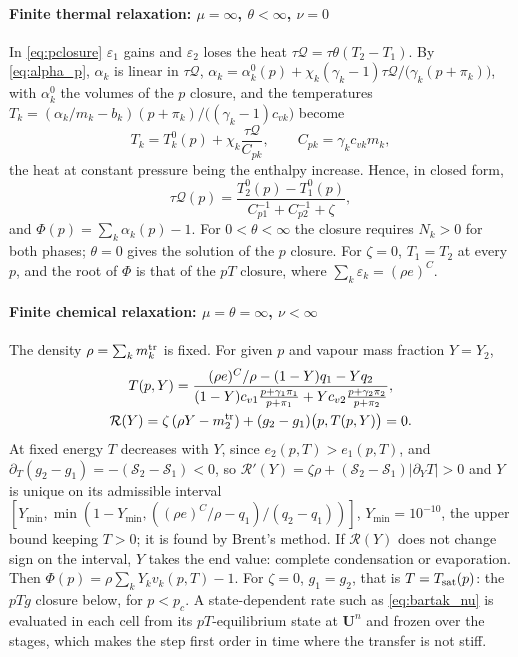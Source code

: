 \paragraph{Finite thermal relaxation: $\mu=\infty$, $\theta<\infty$, $\nu=0$}
In \eqref{eq:pclosure} $\varepsilon_1$ gains and $\varepsilon_2$ loses the heat $\tau\mathcal Q=\tau\theta(T_2-T_1)$. By \eqref{eq:alpha_p}, $\alpha_k$ is linear in
$\tau\mathcal Q$, $\alpha_k=\alpha^0_k(p)+\chi_k(\gamma_k-1)\tau\mathcal Q/\big(\gamma_k(p+\pi_k)\big)$, with $\alpha^0_k$ the volumes of the $p$ closure, and the
temperatures $T_k=(\alpha_k/m_k-b_k)(p+\pi_k)/\big((\gamma_k-1)c_{vk}\big)$ become
\[
T_k=T^0_k(p)+\chi_k\frac{\tau\mathcal Q}{C_{pk}},\qquad C_{pk}=\gamma_kc_{vk}m_k ,
\]
the heat at constant pressure being the enthalpy increase. Hence, in closed form,
\begin{equation}
\tau\mathcal Q(p)=\frac{T^0_2(p)-T^0_1(p)}{C_{p1}^{-1}+C_{p2}^{-1}+\zeta},
\label{eq:dQ}
\end{equation}
and $\Phi(p)=\sum_k\alpha_k(p)-1$. For $0<\theta<\infty$ the closure requires $N_k>0$ for both phases; $\theta=0$ gives the solution
of the $p$ closure. For $\zeta=0$, $T_1=T_2$ at every $p$, and the root of $\Phi$ is that of the $pT$ closure, where
$\sum_k\varepsilon_k=(\rho e)^C$.

\paragraph{Finite chemical relaxation: $\mu=\theta=\infty$, $\nu<\infty$}
The density $\rho=\sum_km^{\rm tr}_k$ is fixed. For given $p$ and vapour mass fraction $Y=Y_2$,
\begin{equation}
\begin{gathered}
T(p,Y)=\frac{(\rho e)^C/\rho-(1-Y)q_1-Yq_2}{(1-Y)c_{v1}\frac{p+\gamma_1\pi_1}{p+\pi_1}+Yc_{v2}\frac{p+\gamma_2\pi_2}{p+\pi_2}},\\
\mathcal R(Y)=\zeta\,(\rho Y-m^{\rm tr}_2)+(g_2-g_1)\big(p,T(p,Y)\big)=0 .
\end{gathered}
\label{eq:nuclosure}
\end{equation}
At fixed energy $T$ decreases with $Y$, since $e_2(p,T)>e_1(p,T)$, and $\partial_T(g_2-g_1)=-(\mathcal S_2-\mathcal S_1)<0$, so
$\mathcal R'(Y)=\zeta\rho+(\mathcal S_2-\mathcal S_1)|\partial_YT|>0$ and $Y$ is unique on its admissible interval
$[Y_{\min},\min(1-Y_{\min},((\rho e)^C/\rho-q_1)/(q_2-q_1))]$, $Y_{\min}=10^{-10}$, the upper bound keeping $T>0$; it is found by Brent's method. If $\mathcal R(Y)$ does not change sign on the interval, $Y$ takes
the end value: complete condensation or evaporation. Then $\Phi(p)=\rho\sum_kY_kv_k(p,T)-1$. For $\zeta=0$, $g_1=g_2$, that is
$T=T_{\rm sat}(p)$: the $pTg$ closure below, for $p<p_c$. A state-dependent rate such as \eqref{eq:bartak_nu}
is evaluated in each cell from its $pT$-equilibrium state at $\mathbf U^n$ and frozen over the stages, which makes the step first
order in time where the transfer is not stiff.

